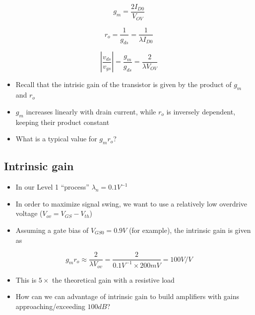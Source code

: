 \documentclass[11pt]{article}
\providecommand{\tightlist}{%
      \setlength{\itemsep}{0pt}\setlength{\parskip}{0pt}}
\begin{document}
    \begin{equation}
g_m = \dfrac{2I_{D0}}{V_{OV}}
\end{equation}

\begin{equation}
r_o = \dfrac{1}{g_{ds}} = \dfrac{1}{\lambda I_{D0}}
\end{equation}

\begin{equation}
\left|\dfrac{v_{ds}}{v_{gs}}\right| = \dfrac{g_m}{g_{ds}} = \dfrac{2}{\lambda V_{OV}}
\end{equation}

    \begin{itemize}
\tightlist
\item
  Recall that the intrisic gain of the transistor is given by the
  product of \(g_m\) and \(r_o\)
\item
  \(g_m\) increases linearly with drain current, while \(r_o\) is
  inversely dependent, keeping their product constant
\item
  What is a typical value for \(g_m r_o\)?
\end{itemize}

    \hypertarget{intrinsic-gain}{%
\subsection{Intrinsic gain}\label{intrinsic-gain}}

    \begin{itemize}
\tightlist
\item
  In our Level 1 ``process'' \(\lambda_n = 0.1 V^{-1}\)
\item
  In order to maximize signal swing, we want to use a relatively low
  overdrive voltage (\(V_{ov} = V_{GS} - V_{th}\))
\item
  Assuming a gate bias of \(V_{GS0} = 0.9V\) (for example), the
  intrinsic gain is given as
\end{itemize}

\begin{equation}
g_mr_o \approx \dfrac{2}{\lambda V_{ov}} = \dfrac{2}{0.1 V^{-1} \times 200mV} = 100 V/V
\end{equation}

\begin{itemize}
\tightlist
\item
  This is \(5 \times\) the theoretical gain with a resistive load
\item
  How can we can advantage of intrinsic gain to build amplifiers with
  gains approaching/exceeding \(100dB\)?
\end{itemize}
\end{document}
